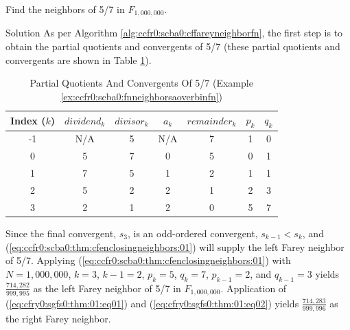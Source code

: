 \begin{vworkexamplestatement}
\label{ex:ccfr0:scba0:fnneighborsaoverbinfn}
Find the neighbors of 5/7 in $F_{1,000,000}$.
\end{vworkexamplestatement}
\begin{vworkexampleparsection}{Solution}
As per Algorithm \ref{alg:ccfr0:scba0:cffareyneighborfn}, the first
step is to obtain the partial quotients and convergents of 5/7
(these partial quotients and convergents are shown in
Table \ref{tbl:ex:ccfr0:scba0:fnneighborsaoverbinfn}).

\begin{table}
\caption{Partial Quotients And Convergents Of 5/7 
		 (Example \ref{ex:ccfr0:scba0:fnneighborsaoverbinfn})}
\label{tbl:ex:ccfr0:scba0:fnneighborsaoverbinfn}
\begin{center}
\begin{tabular}{|c|c|c|c|c|c|c|}
\hline
\small{Index ($k$)} & \small{$dividend_k$}  & \small{$divisor_k$} & \small{$a_k$}   & \small{$remainder_k$} & \small{$p_k$}    & \small{$q_k$}  \\
\hline
\hline
\small{-1}    & \small{N/A}           & \small{5}           & \small{N/A}     & \small{7}             & \small{1}        & \small{0}      \\
\hline
\small{0}     & \small{5}             & \small{7}           & \small{0}       & \small{5}             & \small{0}        & \small{1}      \\
\hline
\small{1}     & \small{7}             & \small{5}           & \small{1}       & \small{2}             & \small{1}        & \small{1}      \\ 
\hline
\small{2}     & \small{5}             & \small{2}           & \small{2}       & \small{1}             & \small{2}        & \small{3}      \\ 
\hline
\small{3}     & \small{2}             & \small{1}           & \small{2}       & \small{0}             & \small{5}        & \small{7}      \\
\hline
\end{tabular}
\end{center}
\end{table}

Since the final convergent, $s_{3}$, is an odd-ordered convergent, $s_{k-1} < s_k$, and
(\ref{eq:ccfr0:scba0:thm:cfenclosingneighbors:01}) will supply the left Farey neighbor
of 5/7.  Applying (\ref{eq:ccfr0:scba0:thm:cfenclosingneighbors:01}) with
$N=1,000,000$, $k=3$, $k-1=2$, $p_k = 5$, $q_k = 7$, $p_{k-1}=2$, and $q_{k-1}=3$
yields $\frac{714,282}{999,995}$ as the left Farey neighbor of 5/7 in $F_{1,000,000}$.
Application of (\ref{eq:cfry0:sgfs0:thm:01:eq01}) 
and (\ref{eq:cfry0:sgfs0:thm:01:eq02})  
yields $\frac{714,283}{999,996}$ as the right Farey neighbor.
\end{vworkexampleparsection}


